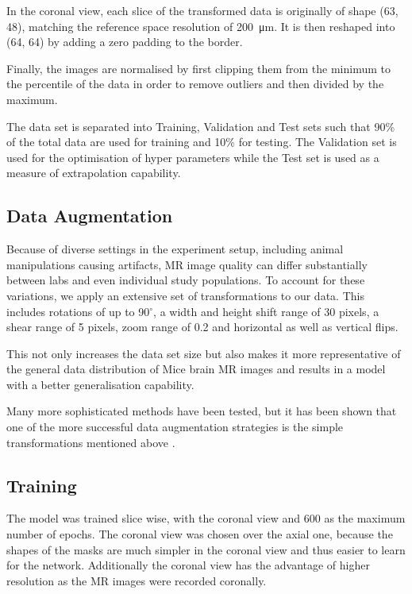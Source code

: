 In the coronal view, each slice of the transformed data is originally of shape (63, 48), matching the reference space resolution of \SI{200}{\micro\metre}.
It is then reshaped into (64, 64) by adding a zero padding to the border.

Finally, the images are normalised by first clipping them from the minimum to the  percentile of the data in order to remove outliers and then divided by the maximum.

The data set is separated into Training, Validation and Test sets such that 90\% of the total data are used for training and 10\% for testing.
The Validation set is used for the optimisation of hyper parameters while the Test set is used as a measure of extrapolation capability.

\subsection{Data Augmentation} \label{Data Augmentation}

Because of diverse settings in the experiment setup, including animal manipulations causing artifacts, MR image quality can differ substantially between labs and even individual study populations.
To account for these variations, we apply an extensive set of transformations to our data.
This includes rotations of up to 90$^{\circ}$, a width and height shift range of 30 pixels, a shear range of 5 pixels, zoom range of 0.2 and horizontal as well as vertical flips.

This not only increases the data set size but also makes it more representative of the general data distribution of Mice brain MR images and results in a model with a better generalisation capability.

Many more sophisticated methods have been tested, but it has been shown that one of the more successful data augmentation strategies is the simple transformations mentioned above \cite{perez_effectiveness_2017}.


\subsection{Training}
The model was trained slice wise, with the coronal view and 600 as the maximum number of epochs.
The coronal view was chosen over the axial one, because the shapes of the masks are much simpler in the coronal view and thus easier to learn for the network.
Additionally the coronal view has the advantage of higher resolution as the MR images were recorded coronally.

